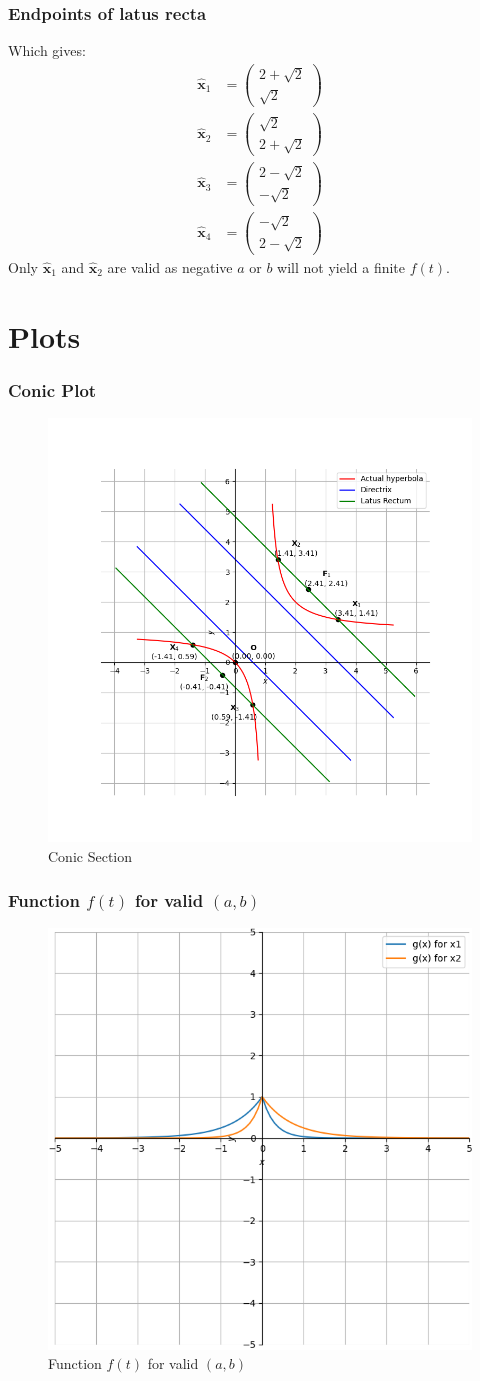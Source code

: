 \documentclass{beamer}
\theoremstyle{remark}
\newcommand{\myvec}[1]{\ensuremath{\begin{pmatrix}#1\end{pmatrix}}}
\let\vec\mathbf
\numberwithin{equation}{section}
\begin{document}
\begin{frame}
\frametitle{Endpoints of latus recta}
Which gives:
	\begin{align*}
		\vec{\hat{x}}_1 &= \myvec{2+\sqrt{2} \\ \sqrt{2}}\\
		\vec{\hat{x}}_2 &= \myvec{\sqrt{2} \\ 2+\sqrt{2}}\\
		\vec{\hat{x}}_3 &= \myvec{2-\sqrt{2} \\ -\sqrt{2}}\\
		\vec{\hat{x}}_4 &= \myvec{-\sqrt{2} \\ 2-\sqrt{2}}
	\end{align*}
	Only $\vec{\hat{x}}_1$ and $\vec{\hat{x}}_2$ are valid as negative $a$ or $b$ will not yield a finite $f(t)$.
\end{frame}

\section{Plots}
\begin{frame}
\frametitle{Conic Plot}
\begin{figure}
  \centering
  \includegraphics[width=0.6\linewidth]{figs/Hyperbola.png}
  \caption{Conic Section}
\label{fig:Hyperbola}
\end{figure}
\end{frame}

\begin{frame}
\frametitle{Function $f(t)$ for valid $(a,b)$}
\begin{figure}
  \centering
  \includegraphics[width=0.5\linewidth]{figs/function.png}
  \caption{Function $f(t)$ for valid $(a, b)$}
		\label{fig:Function}
\end{figure}
\end{frame}
\end{document}
